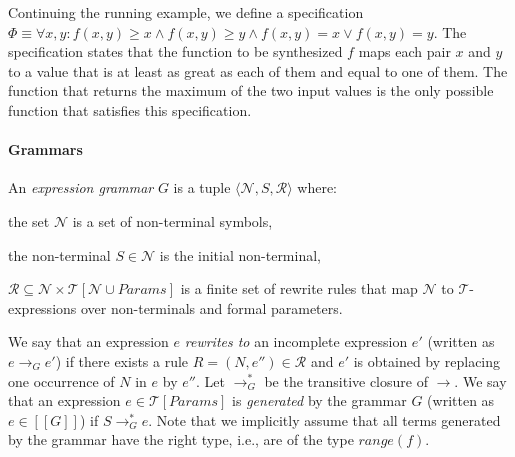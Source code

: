 \documentclass{llncs}
\newcommand\tuple[1]{\langle #1 \rangle}
\newcommand\Expr{e}
\newcommand\Spec{\Phi}
\newcommand\Grammar{G}
\newcommand\sem[1]{[\![ #1 ]\!]}
\newcommand\SynthFun{f}
\newcommand\range{\mathit{range}}
\newcommand\FormalParameters{\mathit{Params}}
\newcommand\NonTerminals{\mathcal{N}}
\newcommand\NonTerminal{N}
\newcommand\StartSymbol{S}
\newcommand\Rules{\mathcal{R}}
\newcommand\Rule{R}
\newcommand\Theory{\mathcal{T}}
\newcommand\RewritesTo{\rightarrow}
\begin{document}
\begin{example}
  \label{ex:running:spec}
  Continuing the running example, we define a specification $\Spec
  \equiv \forall x, y : \SynthFun(x, y) \geq x \wedge \SynthFun(x, y)
  \geq y \wedge f(x, y) = x \vee f(x, y) = y$.
  The specification states that the function to be synthesized
  $\SynthFun$ maps each pair $x$ and $y$ to a value that is at least as
  great as each of them and equal to one of them.
  The function that returns the maximum of the two input values is the
  only possible function that satisfies this specification.
\end{example}

\paragraph{Grammars}
An {\em expression grammar} $\Grammar$ is a tuple $\tuple {
\NonTerminals, \StartSymbol, \Rules }$ where:
\begin{inparaenum}[(a)]
\item the set $\NonTerminals$ is a set of non-terminal symbols,
\item the non-terminal $\StartSymbol \in \NonTerminals$ is the initial non-terminal,
\item $\Rules \subseteq \NonTerminals \times
  \Theory[\NonTerminals \cup \FormalParameters]$ is a finite set
  of rewrite rules that map $\NonTerminals$ to $\Theory$-expressions
  over non-terminals and formal parameters.
\end{inparaenum}
We say that an expression $\Expr$ {\em rewrites to} an incomplete
expression $\Expr'$ (written as $\Expr \RewritesTo_\Grammar \Expr'$) if
there exists a rule $\Rule = (\NonTerminal, \Expr'') \in \Rules$ and
$\Expr'$ is obtained by replacing one occurrence of $\NonTerminal$ in
$\Expr$ by $\Expr''$.
Let $\RewritesTo_\Grammar^*$ be the transitive closure of $\RewritesTo$.
We say that an expression $\Expr \in \Theory[\FormalParameters]$
is {\em generated} by the grammar $\Grammar$ (written as $\Expr \in
\sem{\Grammar}$) if $\StartSymbol \RewritesTo_\Grammar^* \Expr$.
Note that we implicitly assume that all terms generated by the grammar
have the right type, i.e., are of the type $\range(\SynthFun)$.
\end{document}
